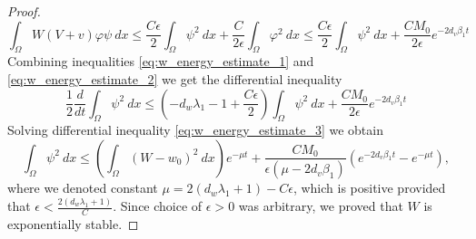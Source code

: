\documentclass[11pt, a4paper]{article}
\theoremstyle{break}
\theoremstyle{break}
\theoremstyle{break}
\theoremstyle{break}
\theoremstyle{break}
\theoremstyle{break}
\theoremstyle{break}
\theoremstyle{break}
\theoremstyle{break}
\theoremstyle{break}
\begin{document}
\begin{proof}
    \begin{equation}
        \label{eq:w_energy_estimate_2}
        \int_\Omega W(V+v) \varphi \psi \:dx
        \leq
        \frac{C \epsilon}{2}\int_\Omega \psi^2 \:dx + \frac{C}{2 \epsilon} \int_\Omega \varphi^2 \:dx 
        \leq
        \frac{C \epsilon}{2}\int_\Omega \psi^2 \:dx + \frac{C M_0}{2 \epsilon} e^{-2d_v\beta_1 t}
    \end{equation}
    Combining inequalities \eqref{eq:w_energy_estimate_1} and \eqref{eq:w_energy_estimate_2} we get the differential inequality
    \begin{equation}
        \label{eq:w_energy_estimate_3}
        \frac{1}{2}\frac{d}{dt}\int_\Omega \psi^2 \:dx
        \leq
        \left( -d_w \lambda_1 - 1 + \frac{C\epsilon}{2} \right) \int_\Omega \psi^2\:dx + \frac{C M_0}{2\epsilon} e^{-2d_v \beta_1 t}
    \end{equation}
    Solving differential inequality \eqref{eq:w_energy_estimate_3} we obtain
    \begin{equation}
        \label{eq:w_energy_estimate_4}
        \int_\Omega \psi^2 \:dx \leq \left( \int_\Omega (W-w_0)^2 \:dx \right) e^{-\mu t} + \frac{C M_0}{\epsilon (\mu - 2d_v \beta_1)} \left( e^{-2d_v \beta_1 t} - e^{-\mu t} \right),
    \end{equation}
    where we denoted constant $\mu = 2(d_w\lambda_1 + 1) - C\epsilon$, which is positive provided that $\epsilon < \frac{2(d_w \lambda_1 + 1)}{C}$. Since choice of $\epsilon > 0$ was arbitrary, we proved that $W$ is exponentially stable.

\end{proof}
\end{document}
